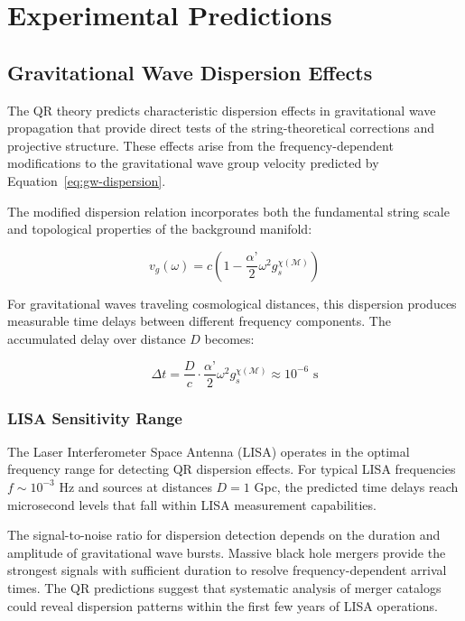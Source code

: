 \section{Experimental Predictions}
\label{sec:experimental-predictions}

\subsection{Gravitational Wave Dispersion Effects}
\label{subsec:gravitational-wave-dispersion}

The QR theory predicts characteristic dispersion effects in gravitational wave propagation that provide direct tests of the string-theoretical corrections and projective structure. These effects arise from the frequency-dependent modifications to the gravitational wave group velocity predicted by Equation~\ref{eq:gw-dispersion}.

The modified dispersion relation incorporates both the fundamental string scale and topological properties of the background manifold:

\begin{equation}
v_g(\omega) = c\left(1 - \frac{\alpha’}{2} \omega^2 g_s^{\chi(\mathcal{M})}\right)
\label{eq:gw-dispersion-detailed}
\end{equation}

For gravitational waves traveling cosmological distances, this dispersion produces measurable time delays between different frequency components. The accumulated delay over distance $D$ becomes:

\begin{equation}
\Delta t = \frac{D}{c} \cdot \frac{\alpha’}{2} \omega^2 g_s^{\chi(\mathcal{M})} \approx 10^{-6} \text{ s}
\label{eq:gw-time-delay-prediction}
\end{equation}

\subsubsection{LISA Sensitivity Range}
\label{subsubsec:lisa-sensitivity}

The Laser Interferometer Space Antenna (LISA) operates in the optimal frequency range for detecting QR dispersion effects. For typical LISA frequencies $f \sim 10^{-3}$ Hz and sources at distances $D = 1$ Gpc, the predicted time delays reach microsecond levels that fall within LISA measurement capabilities.

The signal-to-noise ratio for dispersion detection depends on the duration and amplitude of gravitational wave bursts. Massive black hole mergers provide the strongest signals with sufficient duration to resolve frequency-dependent arrival times. The QR predictions suggest that systematic analysis of merger catalogs could reveal dispersion patterns within the first few years of LISA operations.

